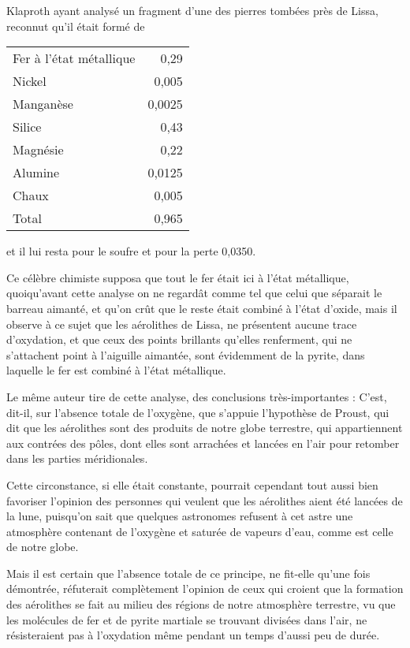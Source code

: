 \documentclass[a4paper, 12pt, oneside, french]{article}
\begin{document}
Klaproth ayant analysé un fragment d'une des pierres tombées près de Lissa, reconnut qu'il était formé de
\begin{table}[H]
    \centering
    \Fontauri
    \large
    \begin{tabular}{l r}
        Fer à l'état métallique & 0,29 \\
        Nickel & 0,005 \\
        Manganèse & 0,0025 \\
        Silice & 0,43 \\
        Magnésie & 0,22 \\
        Alumine & 0,0125 \\
        Chaux & 0,005 \\ \hline
        Total & 0,965 \\
    \end{tabular}
\end{table}
et il lui resta pour le soufre et pour la perte 0,0350.

Ce célèbre chimiste supposa que tout le fer était ici à l'état métallique, quoiqu'avant cette analyse on ne regardât comme tel que celui que séparait le barreau aimanté, et qu'on crût que le reste était combiné à l'état d'oxide, mais il observe à ce sujet que les aérolithes de Lissa, ne présentent aucune trace d'oxydation, et que ceux des points brillants qu'elles renferment, qui ne s'attachent point à l'aiguille aimantée, sont évidemment de la pyrite, dans laquelle le fer est combiné à l'état métallique.

Le même auteur tire de cette analyse, des conclusions très-importantes : \og C'est, dit-il, sur l'absence totale de l'oxygène, que s'appuie l'hypothèse de Proust, qui dit que les aérolithes sont des produits de notre globe terrestre, qui appartiennent aux contrées des pôles, dont elles sont arrachées et lancées en l'air pour retomber dans les parties méridionales. \fg

Cette circonstance, si elle était constante, pourrait cependant tout aussi bien favoriser l'opinion des personnes qui veulent que les aérolithes aient été lancées de la lune, puisqu'on sait que quelques astronomes refusent à cet astre une atmosphère contenant de l'oxygène et saturée de vapeurs d'eau, comme est celle de notre globe.

Mais il est certain que l'absence totale de ce principe, ne fit-elle qu'une fois démontrée, réfuterait complètement l'opinion de ceux qui croient que la formation des aérolithes se fait au milieu des régions de notre atmosphère terrestre, vu que les molécules de fer et de pyrite martiale se trouvant divisées dans l'air, ne résisteraient pas à l'oxydation même pendant un temps d'aussi peu de durée.
\end{document}
